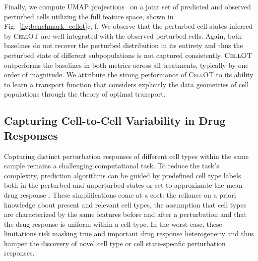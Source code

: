 Finally, we compute UMAP projections~\citep{umap} on a joint set of predicted and observed perturbed cells utilizing the full feature space, shown in Fig.~\ref{fig:benchmark_cellot}c, f.
We observe that the perturbed cell states inferred by \textsc{CellOT} are well integrated with the observed perturbed cells. Again, both baselines do not recover the perturbed distribution in its entirety %
and thus the perturbed state of different subpopulations is not captured consistently.
$\textsc{CellOT}$ outperforms the baselines in both metrics across all treatments, typically by one order of magnitude.
We attribute the strong performance of \textsc{CellOT} to its ability to learn a transport function that considers explicitly the data geometries of cell populations through the theory of optimal transport.

\subsection{Capturing Cell-to-Cell Variability in Drug Responses}
 Capturing distinct perturbation responses of different cell types within the same sample remains a challenging computational task. To reduce the task's complexity, prediction algorithms can be guided by predefined cell type labels both in the perturbed and unperturbed states \citep{chen2020dissecting} or set to approximate the mean drug response \citep{lotfollahi2019scgen}.  These simplifications come at a cost: the reliance on a priori knowledge about present and relevant cell types, the assumption that cell types are characterized by the same features before and after a perturbation and that the drug response is uniform within a cell type.
In the worst case, these limitations risk masking true and important drug response heterogeneity  and thus hamper the discovery of novel cell type or cell state-specific perturbation responses.


